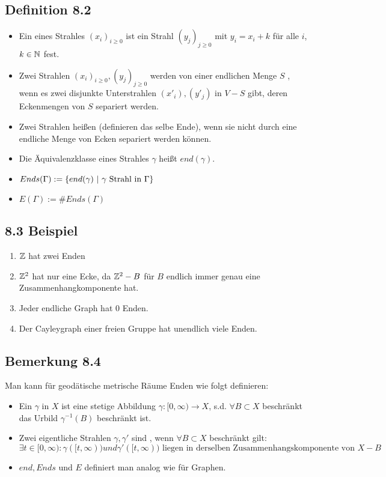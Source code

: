 \documentclass{article}
\begin{document}
\subsection{Definition 8.2}
\begin{itemize}
	\item Ein  eines Strahles $(x_i)_{i \geq 0}$ ist ein Strahl $(y_j)_{j\geq 0}$ mit $y_i = x_i+k$ für alle $i$, $k\in \mathbb{N}$ fest.
	
	\item Zwei Strahlen $(x_i)_{i\geq 0}, (y_j)_{j\geq 0}$ werden von einer endlichen Menge $S$ , wenn es zwei disjunkte Unterstrahlen $(x'_i), (y'_j)$ in $V-S$ gibt, deren Eckenmengen von $S$ separiert werden.
	
	
	
	\item  Zwei Strahlen  heißen  (definieren das selbe Ende), wenn sie nicht durch eine endliche Menge von Ecken separiert werden können.
	\item Die Äquivalenzklasse eines Strahles $\gamma$ heißt  $end(\gamma)$.
	\item $Ends(\Gamma) := \set{end(\gamma)}{\gamma \text{ Strahl in }\Gamma}$
	\item $E(\Gamma) := \# Ends(\Gamma)$
\end{itemize}

\subsection{8.3 Beispiel}
\begin{enumerate}
	\item $\mathbb{Z}$ hat zwei Enden
	\item $\mathbb{Z}^2$ hat nur eine Ecke, da $\mathbb{Z}^2-B$ für $B$ endlich immer genau eine Zusammenhangkomponente hat.
	\item Jeder endliche Graph hat 0 Enden.
	\item Der Cayleygraph einer freien Gruppe hat unendlich viele Enden.
\end{enumerate}

\subsection{Bemerkung 8.4}
Man kann für geodätische metrische Räume Enden wie folgt definieren:
\begin{itemize}
	\item Ein  $\gamma$ in $X$ ist eine stetige Abbildung $\gamma:[0,\infty) \rightarrow X$, s.d. $\forall B \subset X$ beschränkt das Urbild $\gamma^{-1}(B)$ beschränkt ist.
	\item Zwei eigentliche Strahlen $\gamma, \gamma'$ sind , wenn $\forall B \subset X$ beschränkt gilt:
	\[\exists t \in [0,\infty): \gamma([t,\infty)) und \gamma'([t,\infty)) \text{ liegen in derselben Zusammenhangskomponente von } X- B \]
	\item $end, Ends$ und $E$ definiert man analog wie für Graphen.
\end{itemize}
\end{document}
